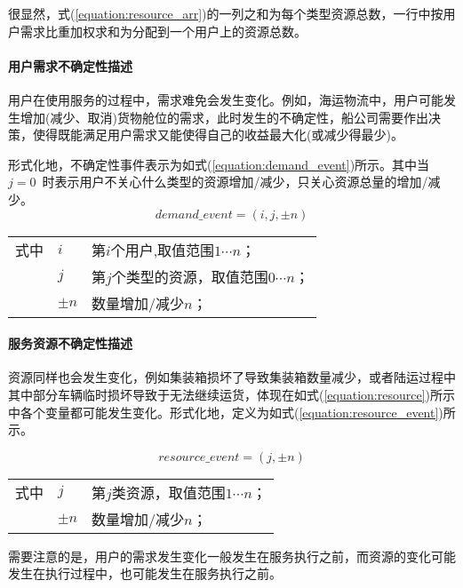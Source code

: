 很显然，式(\ref{equation:resource_arr})的一列之和为每个类型资源总数，一行中按用户需求比重加权求和为分配到一个用户上的资源总数。

\setcounter{paragraph}{0}
\paragraph{用户需求不确定性描述}

用户在使用服务的过程中，需求难免会发生变化。例如，海运物流中，用户可能发生增加(减少、取消)货物舱位的需求，此时发生的不确定性，船公司需要作出决策，使得既能满足用户需求又能使得自己的收益最大化(或减少得最少)。

形式化地，不确定性事件表示为如式(\ref{equation:demand_event})所示。其中当~$j=0$~时表示用户不关心什么类型的资源增加/减少，只关心资源总量的增加/减少。
\begin{equation}\label{equation:demand_event}
demand\_event = (i, j, \pm n)
\end{equation}
\begin{tabularx}{\textwidth}{@{}l@{\quad}l@{\pozhehao }X@{}}
    式中
    & $i$ & 第$i$个用户,取值范围$1 \cdots n$；\\
    & $j$ & 第$j$个类型的资源，取值范围$0 \cdots n$；\\
    & $\pm n$ & 数量增加/减少$n$；
\end{tabularx}\vspace{\wordsep}

\paragraph{服务资源不确定性描述}

资源同样也会发生变化，例如集装箱损坏了导致集装箱数量减少，或者陆运过程中其中部分车辆临时损坏导致于无法继续运货，体现在如式(\ref{equation:resource})所示中各个变量都可能发生变化。形式化地，定义为如式(\ref{equation:resource_event})所示。

\begin{equation}\label{equation:resource_event}
resource\_event = (j, \pm n)
\end{equation}
\begin{tabularx}{\textwidth}{@{}l@{\quad}l@{\pozhehao }X@{}}
    式中
    & $j$ & 第$j$类资源，取值范围$1 \cdots n$；\\
    & $\pm n$ & 数量增加/减少$n$；
\end{tabularx}\vspace{\wordsep}

需要注意的是，用户的需求发生变化一般发生在服务执行之前，而资源的变化可能发生在执行过程中，也可能发生在服务执行之前。
%
%
%
%
%



